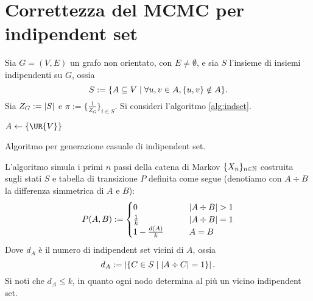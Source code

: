 \section{Correttezza del MCMC per indipendent set}

Sia $G=(V,E)$ un grafo non orientato, con $E\ne\emptyset$, e sia $S$ l'insieme di insiemi indipendenti su $G$, ossia
\begin{equation*}
	S := \{A\subseteq V\mid \forall u,v\in A, \{u,v\}\notin A\} \text.
\end{equation*}
Sia $Z_G:=\left|S\right|$ e $\pi:=\{\frac{1}{Z_G}\}_{i\in S}$. Si consideri l'algoritmo \ref{alg:indset}.

\begin{algorithm}
	\DontPrintSemicolon

	$A\asn\{\UR{V}\}$

	 \;

	\caption{Algoritmo per generazione casuale di indipendent set.}
	\label{alg:indset}
\end{algorithm}

L'algoritmo simula i primi $n$ passi della catena di Markov $\{X_n\}_{n\in\mathbb N}$ costruita sugli stati $S$ e tabella di transizione $P$ definita come segue (denotiamo con $A\div B$ la differenza simmetrica di $A$ e $B$):
\begin{equation*}
	P(A,B):=\begin{cases}
		0                  & \qquad \card{A\div B}>1 \\
		\frac 1 k          & \qquad \card{A\div B}=1 \\
		1 - \frac{d(A)}{k} & \qquad A=B
	\end{cases}
\end{equation*}
Dove $d_A$ è il numero di indipendent set vicini di $A$, ossia
\begin{equation*}
	d_A:=\left|\{C\in S\mid \left|A\div C\right|=1\}\right| \text.
\end{equation*}
Si noti che $d_A\le k$, in quanto ogni nodo determina al più un vicino indipendent set.

